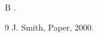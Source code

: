 \documentclass{article}
\begin{document}
B \citet{a}.
\begin{thebibliography}{9}
 J. Smith, Paper, 2000.
\end{thebibliography}
\end{document}
